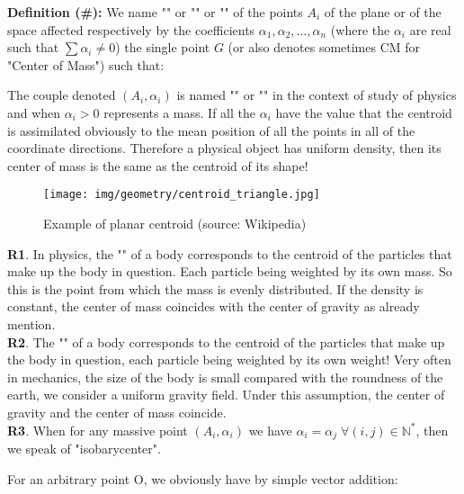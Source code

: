    \textbf{Definition (\#\mydef):} We name "" or "" or "" of the points $A_i$ of the plane or of the space affected respectively by the coefficients $\alpha_1,\alpha_2,\ldots,\alpha_n$ (where the $\alpha_i$ are real such that $\sum \alpha_i\neq 0$) the single point $G$ (or also denotes sometimes CM for "Center of Mass") such that:
	
	The couple denoted $(A_i,\alpha_i)$ is named "" or "" in the context of study of physics and when $\alpha_i>0$ represents a mass. If all the $\alpha_i$ have the value that the centroid is assimilated obviously to the  mean position of all the points in all of the coordinate directions.  Therefore a physical object has uniform density, then its center of mass is the same as the centroid of its shape!
	\begin{figure}[H]
		\centering
		\texttt{[image: img/geometry/centroid\_triangle.jpg]}
		\caption{Example of planar centroid (source: Wikipedia)}
	\end{figure}
	
	\begin{tcolorbox}[title=Remarks,colframe=black,arc=10pt]
	\textbf{R1}. In physics, the "" of a body corresponds to the centroid of the particles that make up the body in question. Each particle being weighted by its own mass. So this is the point from which the mass is evenly distributed. If the density is constant, the center of mass coincides with the center of gravity as already mention.\\

	\textbf{R2}. The "" of a body corresponds to the centroid of the particles that make up the body in question, each particle being weighted by its own weight! Very often in mechanics, the size of the body is small compared with the roundness of the earth, we consider a uniform gravity field. Under this assumption, the center of gravity and the center of mass coincide.\\

	\textbf{R3}. When for any massive point $(A_i,\alpha_i)$ we have $\alpha_i=\alpha_j\;\forall (i,j)\in \mathbb{N}^{*}$, then we speak of "isobarycenter".
	\end{tcolorbox}
	For an arbitrary point O, we obviously have by simple vector addition:
	
